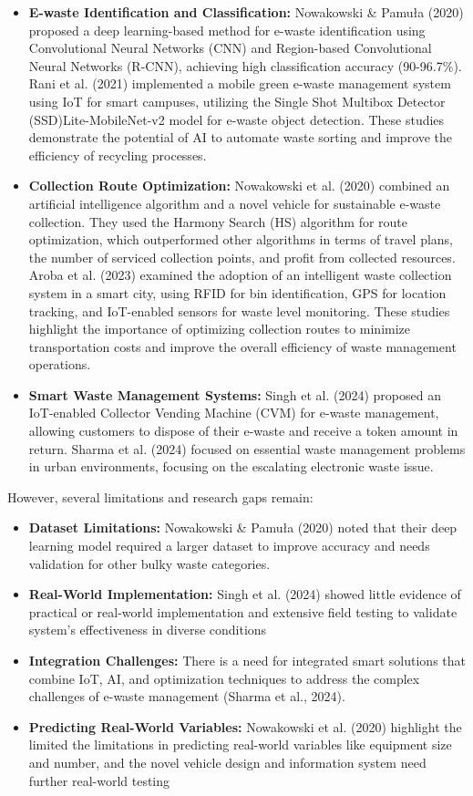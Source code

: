 \begin{itemize}
	\item \textbf{E-waste Identification and Classification:}  Nowakowski & Pamuła (2020) proposed a deep learning-based method for e-waste identification using Convolutional Neural Networks (CNN) and Region-based Convolutional Neural Networks (R-CNN), achieving high classification accuracy (90-96.7\%). Rani et al. (2021) implemented a mobile green e-waste management system using IoT for smart campuses, utilizing the Single Shot Multibox Detector (SSD)Lite-MobileNet-v2 model for e-waste object detection. These studies demonstrate the potential of AI to automate waste sorting and improve the efficiency of recycling processes.
	\item \textbf{Collection Route Optimization:} Nowakowski et al. (2020) combined an artificial intelligence algorithm and a novel vehicle for sustainable e-waste collection. They used the Harmony Search (HS) algorithm for route optimization, which outperformed other algorithms in terms of travel plans, the number of serviced collection points, and profit from collected resources. Aroba et al. (2023) examined the adoption of an intelligent waste collection system in a smart city, using RFID for bin identification, GPS for location tracking, and IoT-enabled sensors for waste level monitoring. These studies highlight the importance of optimizing collection routes to minimize transportation costs and improve the overall efficiency of waste management operations.
	\item \textbf{Smart Waste Management Systems:} Singh et al. (2024) proposed an IoT-enabled Collector Vending Machine (CVM) for e-waste management, allowing customers to dispose of their e-waste and receive a token amount in return. Sharma et al. (2024) focused on essential waste management problems in urban environments, focusing on the escalating electronic waste issue.
\end{itemize}

\noindent However, several limitations and research gaps remain:

\begin{itemize}
	\item \textbf{Dataset Limitations:} Nowakowski & Pamuła (2020) noted that their deep learning model required a larger dataset to improve accuracy and needs validation for other bulky waste categories.
	\item \textbf{Real-World Implementation:} Singh et al. (2024) showed little evidence of practical or real-world implementation and extensive field testing to validate system's effectiveness in diverse conditions
	\item \textbf{Integration Challenges:} There is a need for integrated smart solutions that combine IoT, AI, and optimization techniques to address the complex challenges of e-waste management (Sharma et al., 2024).
	\item \textbf{Predicting Real-World Variables:} Nowakowski et al. (2020) highlight the limited the limitations in predicting real-world variables like equipment size and number, and the novel vehicle design and information system need further real-world testing
\end{itemize}

